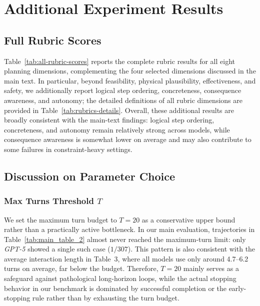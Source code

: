\section{Additional Experiment Results}
\label{app:additional-experiment-results}

\subsection{Full Rubric Scores}
\label{app:full-rubric-scores}

Table~\ref{tab:all-rubric-scores} reports the complete rubric results for all eight planning dimensions, complementing the four selected dimensions discussed in the main text. 
In particular, beyond feasibility, physical plausibility, effectiveness, and safety, we additionally report logical step ordering, concreteness, consequence awareness, and autonomy; the detailed definitions of all rubric dimensions are provided in Table~\ref{tab:rubrics-details}. 
Overall, these additional results are broadly consistent with the main-text findings: logical step ordering, concreteness, and autonomy remain relatively strong across models, while consequence awareness is somewhat lower on average and may also contribute to some failures in constraint-heavy settings. 

\subsection{Discussion on Parameter Choice}
\label{app:discuss-parameter-choice}

\subsubsection{Max Turns Threshold $T$}
\label{app:max-turns-threshold-ablation}

We set the maximum turn budget to $T=20$ as a conservative upper bound rather than a practically active bottleneck. 
In our main evaluation, trajectories in Table~\ref{tab:main_table_2} almost never reached the maximum-turn limit: only \textit{GPT-5} showed a single such case ($1/307$). This pattern is also consistent with the average interaction length in Table~3, where all models use only around 4.7--6.2 turns on average, far below the budget. Therefore, $T=20$ mainly serves as a safeguard against pathological long-horizon loops, while the actual stopping behavior in our benchmark is dominated by successful completion or the early-stopping rule rather than by exhausting the turn budget.

